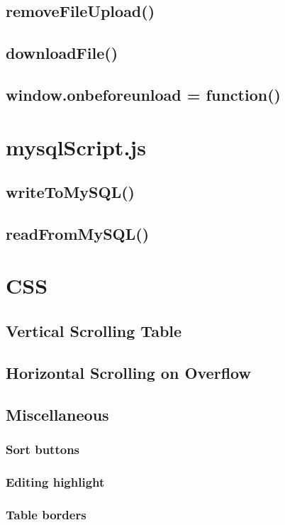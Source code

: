 \documentclass[letterpaper]{article}
\begin{document}
\subsection{removeFileUpload()}
\subsection{downloadFile()}
\subsection{window.onbeforeunload = function()}

\newpage

\section{mysqlScript.js}

\subsection{writeToMySQL()}
\subsection{readFromMySQL()}

\newpage

\section{CSS}\label{CSS}

\subsection{Vertical Scrolling Table}
\subsection{Horizontal Scrolling on Overflow}\label{overflow-x}
\subsection{Miscellaneous}
\subsubsection{Sort buttons}
\subsubsection{Editing highlight}
\subsubsection{Table borders}
\end{document}
